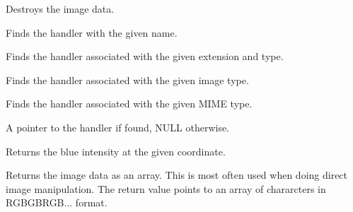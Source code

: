 \label{wximagedestroy}


Destroys the image data.



Finds the handler with the given name.


Finds the handler associated with the given extension and type.


Finds the handler associated with the given image type.


Finds the handler associated with the given MIME type.






A pointer to the handler if found, NULL otherwise.



\label{wximagegetblue}


Returns the blue intensity at the given coordinate.

\label{wximagegetdata}


Returns the image data as an array. This is most often used when doing
direct image manipulation. The return value points to an array of
chararcters in RGBGBRGB... format.

\label{wximagegetgreen}

